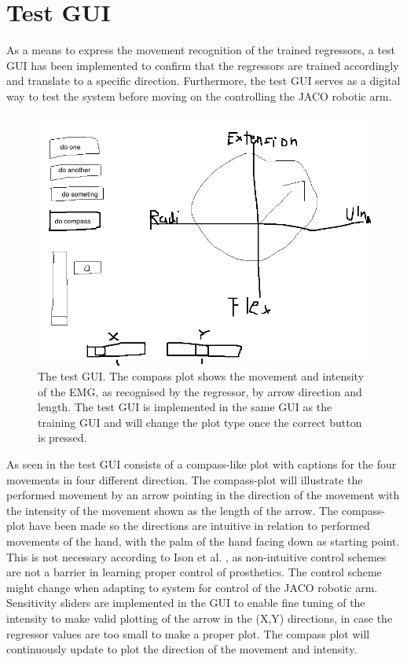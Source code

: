 \section{Test GUI}

As a means to express the movement recognition of the trained regressors, a test GUI has been implemented to confirm that the regressors are trained accordingly and translate to a specific direction. Furthermore, the test GUI serves as a digital way to test the system before moving on the controlling the JACO robotic arm. 

\begin{figure}[H]
	\includegraphics[width=.4\textwidth]{figures/GUI/GUI_test.png}  %
	\caption{The test GUI. The compass plot shows the movement and intensity of the EMG, as recognised by the regressor, by arrow direction and length. The test GUI is implemented in the same GUI as the training GUI and will change the plot type once the correct button is pressed.}
	\label{fig:testGUI}
\end{figure}

As seen in  the test GUI consists of a compass-like plot with captions for the four movements in four different direction. The compass-plot will illustrate the performed movement by an arrow pointing in the direction of the movement with the intensity of the movement shown as the length of the arrow. The compass-plot have been made so the directions are intuitive in relation to performed movements of the hand, with the palm of the hand facing down as starting point. This is not necessary according to Ison et al. \cite{Ison2016}, as non-intuitive control schemes are not a barrier in learning proper control of prosthetics. The control scheme might change when adapting to system for control of the JACO robotic arm. Sensitivity sliders are implemented in the GUI to enable fine tuning of the intensity to make valid plotting of the arrow in the (X,Y) directions, in case the regressor values are too small to make a proper plot. 
The compass plot will continuously update to plot the direction of the movement and intensity. 